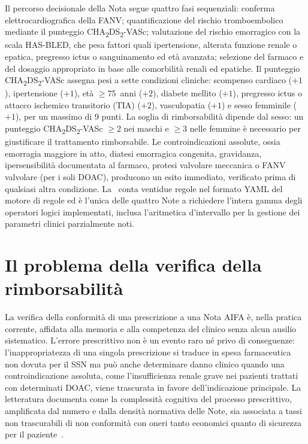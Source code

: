 Il percorso decisionale della Nota segue quattro fasi sequenziali: conferma
elettrocardiografica della FANV; quantificazione del rischio tromboembolico
mediante il punteggio CHA\textsubscript{2}DS\textsubscript{2}-VASc; valutazione
del rischio emorragico con la scala HAS-BLED, che pesa fattori quali ipertensione, alterata funzione renale o epatica, pregresso ictus o sanguinamento ed età avanzata; selezione del farmaco e del
dosaggio appropriato in base alle comorbilità renali ed epatiche.
Il punteggio CHA\textsubscript{2}DS\textsubscript{2}-VASc assegna pesi a sette
condizioni cliniche: scompenso cardiaco ($+1$), ipertensione ($+1$), età
$\geq$75~anni ($+2$), diabete mellito ($+1$), pregresso ictus o attacco ischemico transitorio (TIA) ($+2$),
vasculopatia ($+1$) e sesso femminile ($+1$), per un massimo di 9 punti.
La soglia di rimborsabilità dipende dal sesso: un punteggio
CHA\textsubscript{2}DS\textsubscript{2}-VASc $\geq$2 nei maschi e $\geq$3 nelle
femmine è necessario per giustificare il trattamento rimborsabile.
Le controindicazioni assolute, ossia emorragia maggiore in atto, diatesi emorragica
congenita, gravidanza, ipersensibilità documentata al farmaco, protesi valvolare
meccanica o FANV valvolare (per i soli DOAC), producono un esito
 immediato, verificato prima di qualsiasi altra
condizione.
La \notenova\ conta ventidue regole nel formato YAML del motore di regole ed è
l'unica delle quattro Note a richiedere l'intera gamma degli operatori logici
implementati, inclusa l'aritmetica d'intervallo per la gestione dei parametri
clinici parzialmente noti.

\section{Il problema della verifica della rimborsabilità}
\label{sec:problema-verifica}

La verifica della conformità di una prescrizione a una Nota AIFA è, nella pratica
corrente, affidata alla memoria e alla competenza del clinico senza alcun ausilio
sistematico.
L'errore prescrittivo non è un evento raro né privo di conseguenze: l'inappropriatezza
di una singola prescrizione si traduce in spesa farmaceutica non dovuta per il SSN
ma può anche determinare danno clinico quando una controindicazione assoluta,
come l'insufficienza renale grave nei pazienti trattati con determinati DOAC,
viene trascurata in favore dell'indicazione principale.
La letteratura documenta come la complessità cognitiva del processo prescrittivo,
amplificata dal numero e dalla densità normativa delle Note, sia associata a tassi
non trascurabili di non conformità con oneri tanto economici quanto di sicurezza
per il paziente~\cite{berner2007cdss}.


